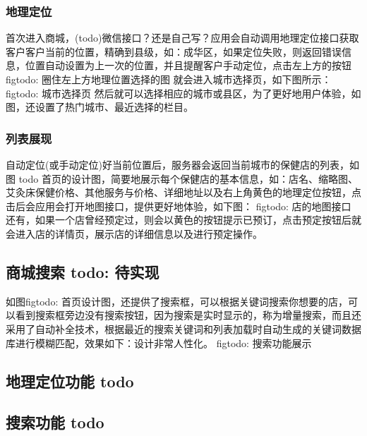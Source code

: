 
        \subsubsection{地理定位}
          \label{subsubsec:地理定位功能}
            首次进入商城，(todo)微信接口？还是自己写？应用会自动调用地理定位接口获取客户客户当前的位置，精确到县级，如：成华区，如果定位失败，则返回错误信息，位置自动设置为上一次的位置，并且提醒客户手动定位，点击左上方的按钮
            figtodo: 圈住左上方地理位置选择的图
            就会进入城市选择页，如下图所示：
            figtodo: 城市选择页
            然后就可以选择相应的城市或县区，为了更好地用户体验，如图，还设置了热门城市、最近选择的栏目。

        \subsubsection{列表展现}
          \label{subsubsec:列表展现}
            自动定位(或手动定位)好当前位置后，服务器会返回当前城市的保健店的列表，如图 todo 首页的设计图，简要地展示每个保健店的基本信息，如：店名、缩略图、艾灸床保健价格、其他服务与价格、详细地址以及右上角黄色的地理定位按钮，点击后会应用会打开地图接口，提供更好地体验，如下图：
            figtodo: 店的地图接口
            还有，如果一个店曾经预定过，则会以黄色的按钮提示已预订，点击预定按钮后就会进入店的详情页，展示店的详细信息以及进行预定操作。

        \subsection{商城搜索 todo: 待实现}
          \label{subsec:商城搜索_todo_待实现}
            如图figtodo: 首页设计图，还提供了搜索框，可以根据关键词搜索你想要的店，可以看到搜索框旁边没有搜索按钮，因为搜索是实时显示的，称为增量搜索，而且还采用了自动补全技术，根据最近的搜索关键词和列表加载时自动生成的关键词数据库进行模糊匹配，效果如下：设计非常人性化。
            figtodo: 搜索功能展示

    \subsection{地理定位功能 todo}
      \label{subsec:地理定位功能_todo}

    \subsection{搜索功能 todo}
      \label{subsec:搜索功能_todo}

